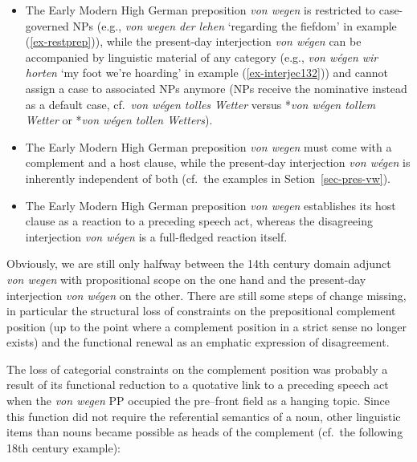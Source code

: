 \documentclass[output=paper
  ,nobabel
  ,draftmode
  ,babelshorthands
  ,colorlinks, citecolor=brown
]{langscibook}
\begin{document}
\begin{itemize}
\item The Early Modern High German preposition \emph{von wegen} is restricted to case-governed NPs (e.g., \emph{von wegen der lehen} `regarding the fiefdom' in example (\ref{ex-restprep})), while the present-day  interjection \emph{von wégen} can be accompanied by linguistic material of any category (e.g., \emph{von wégen wir horten} `my foot we’re hoarding' in example (\ref{ex-interjec132})) and cannot assign a case to associated NPs anymore (NPs receive the nominative instead as a default case, cf.\ \emph{von wégen tolles Wetter} versus *\emph{von wégen tollem Wetter} or *\emph{von wégen tollen Wetters}).

\item The Early Modern High German preposition \emph{von wegen} must come with a complement and a host clause, while the present-day  interjection \emph{von wégen} is inherently independent of both (cf.\ the examples in Setion~\ref{sec-pres-vw}).

\item The Early Modern High German preposition \emph{von wegen} establishes its host clause as a reaction to a preceding speech act, whereas the disagreeing interjection \emph{von wégen} is a full-fledged reaction itself.
\end{itemize}

\largerpage
\noindent
Obviously, we are still only halfway between the 14th century domain adjunct \emph{von wegen} with propositional scope on the one hand and the present-day  interjection \emph{von wégen} on the other. There are still some steps of change missing, in particular the structural loss of constraints on the prepositional complement position (up to the point where a complement position in a strict sense no longer exists) and the functional renewal as an emphatic expression of disagreement.

The loss of categorial constraints on the complement position was probably a result of its functional reduction to a quotative link to a preceding speech act when the \emph{von wegen} PP occupied the pre--front field as a hanging topic. Since this function did not require the referential semantics of a noun, other linguistic items than nouns became possible as heads of the complement (cf.\ the following 18th century example):
\end{document}
